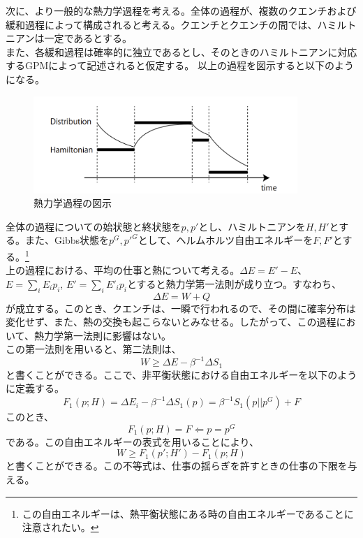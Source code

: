 \documentclass[a4paper,11pt]{jsarticle}
\numberwithin{equation}{section}
\begin{document}
次に、より一般的な熱力学過程を考える。全体の過程が、複数のクエンチおよび緩和過程によって構成されると考える。クエンチとクエンチの間では、ハミルトニアンは一定であるとする。\\
また、各緩和過程は確率的に独立であるとし、そのときのハミルトニアンに対応するGPMによって記述されると仮定する。
以上の過程を図示すると以下のようになる。
\begin{figure}[H]
    \begin{center}
    \includegraphics[width=100mm]{image4.png}
    \end{center}
    \caption{熱力学過程の図示}
    \label{fig:four}
\end{figure}
全体の過程についての始状態と終状態を$p,p'$とし、ハミルトニアンを$H,H'$とする。また、Gibbs状態を$p^G,p'^G$として、ヘルムホルツ自由エネルギーを$F,F'$とする。\footnote{この自由エネルギーは、熱平衡状態にある時の自由エネルギーであることに注意されたい。}\\
上の過程における、平均の仕事と熱について考える。$\Delta E = E'-E$、$E =\sum_{i}E_i p_i$, $E' = \sum_{i}E'_i p_i$とすると熱力学第一法則が成り立つ。すなわち、
\begin{equation}
    \Delta E = W + Q
\end{equation}
が成立する。このとき、クエンチは、一瞬で行われるので、その間に確率分布は変化せず、また、熱の交換も起こらないとみなせる。したがって、この過程において、熱力学第一法則に影響はない。\\
この第一法則を用いると、第二法則は、
\begin{equation}
    W \geq \Delta E - \beta^{-1}\Delta S_1
\end{equation}
と書くことができる。ここで、非平衡状態における自由エネルギーを以下のように定義する。
\begin{equation}
    F_1(p;H) = \Delta E_i - \beta^{-1}\Delta S_1(p) = \beta^{-1}S_1(p||p^G) + F
\end{equation}
このとき、
\begin{equation}
    F_1(p;H) = F \Leftarrow p = p^G
\end{equation}
である。この自由エネルギーの表式を用いることにより、
\begin{equation}
    W \geq F_1(p';H') - F_1(p;H)
\end{equation}
と書くことができる。この不等式は、仕事の揺らぎを許すときの仕事の下限を与える。\\
\end{document}
